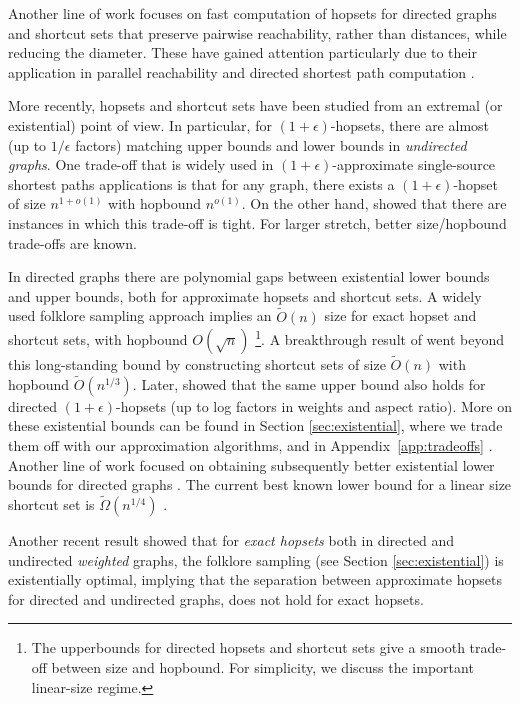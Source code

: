 \documentclass{article}
\theoremstyle{definition}
\theoremstyle{remark}
\begin{document}
Another line of work focuses on fast computation of hopsets for directed graphs and shortcut sets that preserve pairwise reachability, rather than distances, while reducing the diameter. These have gained attention particularly due to their application in parallel reachability and directed shortest path computation \cite{ullman1990high, cao2020efficient, cao2020improved, cao2023exact, fineman2018nearly,jambulapati2019parallel}.

More recently, hopsets and shortcut sets have been studied from an extremal (or existential) point of view.
In particular, for $(1+\epsilon)$-hopsets, there are almost (up to $1/\epsilon$ factors) matching upper bounds \cite{elkin2019journal, huang2019} and lower bounds \cite{abboud2018} in \emph{undirected graphs}. One trade-off that is widely used in $(1+\epsilon)$-approximate single-source shortest paths applications is that for any graph, there exists a $(1+\epsilon)$-hopset of size $n^{1+o(1)}$ with hopbound $n^{o(1)}$.  On the other hand, \cite{abboud2018} showed that there are instances in which this trade-off is tight. For larger stretch, better size/hopbound trade-offs are known.

In directed graphs there are polynomial gaps between existential lower bounds and upper bounds, both for approximate hopsets and shortcut sets. A widely used folklore sampling approach implies an $\widetilde{O}(n)$ size for exact hopset and shortcut sets, with hopbound $O(\sqrt{n})$ \footnote{The upperbounds for directed hopsets and shortcut sets give a smooth trade-off between size and hopbound. For simplicity, we discuss the important linear-size regime.}.
A breakthrough result of \cite{KP22} went beyond this long-standing bound by constructing shortcut sets of size $\widetilde{O}(n)$ with hopbound $\widetilde{O}(n^{1/3})$. 
Later, \cite{BW23} showed that the same upper bound also holds for directed $(1+\epsilon)$-hopsets (up to log factors in weights and aspect ratio). More on these existential bounds can be found in Section \ref{sec:existential}, where we trade them off with our approximation algorithms\iflong \else, and in Appendix~\ref{app:tradeoffs} \fi. Another line of work focused on obtaining subsequently better existential lower bounds for directed graphs \cite{hesse2003directed, huang2021lower, kogan2023towards,  williams2024simpler}. The current best known lower bound for a linear size shortcut set is $\widetilde{\Omega}(n^{1/4})$ \cite{BH23folklore, williams2024simpler}. 

Another recent result \cite{BH23folklore} showed that for \textit{exact hopsets} both in directed and undirected \textit{weighted} graphs, the folklore sampling (see Section \ref{sec:existential}) is existentially optimal, implying that the separation between approximate hopsets for directed and undirected graphs, does not hold for exact hopsets.
\end{document}
